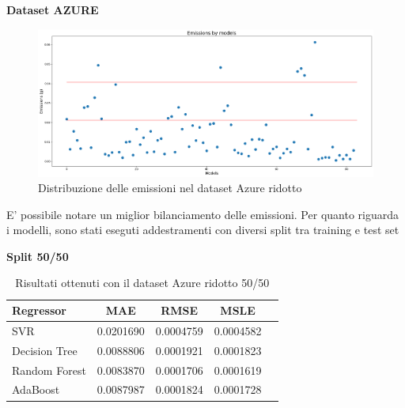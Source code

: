 \newpage


\noindent \textbf{Dataset AZURE}

\begin{figure}[H]
    \centering
    \includegraphics[width=\textwidth]{images/nuova-situazione2-ridotto.png}
    \caption{Distribuzione delle emissioni nel dataset Azure ridotto}
\end{figure}


\noindent E’ possibile notare un miglior bilanciamento delle emissioni. Per quanto riguarda i modelli,
sono stati eseguti addestramenti con diversi split tra training e test set


\noindent\textbf{Split 50/50}


\begin{table}[H]
    \centering
    \begin{tabular}{|>{\centering\arraybackslash}m{5cm}|c|c|c|c|}
        \hline
        \textbf{Regressor} & \textbf{MAE} & \textbf{RMSE} & \textbf{MSLE} \\ [10pt]
        \hline
        SVR & 0.0201690 & 0.0004759 & 0.0004582 \\ [10pt]
        \hline
        Decision Tree & 0.0088806 & 0.0001921 & 0.0001823 \\ [10pt]
        \hline
        Random Forest & 0.0083870 & 0.0001706 & 0.0001619 \\ [10pt]
        \hline
        AdaBoost & 0.0087987 & 0.0001824 & 0.0001728 \\ [10pt]
        \hline
    \end{tabular}
    \caption{Risultati ottenuti con il dataset Azure ridotto 50/50}
    \label{tab:results}
\end{table}

